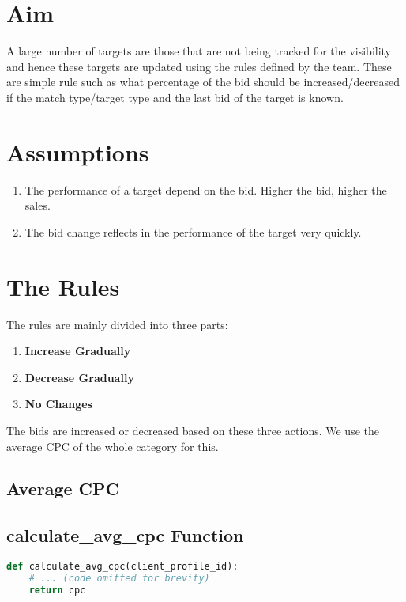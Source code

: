 \section{Aim}

A large number of targets are those that are not being tracked for the visibility and hence these targets are updated using the rules defined by the team. These are simple rule such as what percentage of the bid should be increased/decreased if the match type/target type and the last bid of the target is known.

\section{Assumptions}

\begin{enumerate}
    \item The performance of a target depend on the bid. Higher the bid, higher the sales.
    \item The bid change reflects in the performance of the target very quickly.
\end{enumerate}

\section{The Rules}

The rules are mainly divided into three parts:

\begin{enumerate}
    \item \textbf{Increase Gradually}
    \item \textbf{Decrease Gradually}
    \item \textbf{No Changes}
\end{enumerate}

The bids are increased or decreased based on these three actions. We use the average CPC of the whole category for this.

\subsection{Average CPC}

\subsection*{calculate\_avg\_cpc Function}

\begin{lstlisting}[language=Python]
def calculate_avg_cpc(client_profile_id):
    # ... (code omitted for brevity)
    return cpc
\end{lstlisting}

